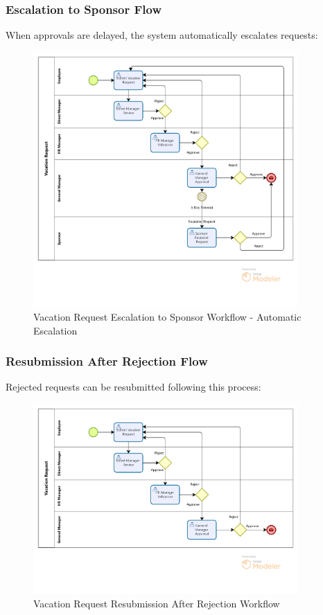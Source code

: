 \documentclass[12pt,a4paper]{article}
\begin{document}
\subsubsection{Escalation to Sponsor Flow}
When approvals are delayed, the system automatically escalates requests:

\begin{figure}[H]
\centering
\includegraphics[width=0.9\textwidth]{Diagrams/Workflows/Vacation-Request-Escalation-to-Sponsor/Vacation-Request-Escalation-to-Sponsor.png}
\caption{Vacation Request Escalation to Sponsor Workflow - Automatic Escalation}
\label{fig:escalation-flow}
\end{figure}

\subsubsection{Resubmission After Rejection Flow}
Rejected requests can be resubmitted following this process:

\begin{figure}[H]
\centering
\includegraphics[width=0.9\textwidth]{Diagrams/Workflows/Vacation-Request-Resubmission-After-Rejection/Vacation-Request-Resubmission-After-Rejection.png}
\caption{Vacation Request Resubmission After Rejection Workflow}
\label{fig:resubmission-flow}
\end{figure}
\end{document}
